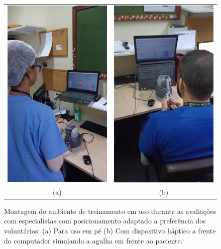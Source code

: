\begin{figure}[ht!]
    \centering
        \begin{tabular}{cc}
        \includegraphics[angle=270,width=0.4\linewidth]{capitulos/figuras/montagem-teste-especialistas-2.jpg} & 
        \includegraphics[angle=270,width=0.4\linewidth]{capitulos/figuras/montagem-teste-especialistas-3.jpg} 
        \\
        (a) & (b)
        \end{tabular}
    \caption{Montagem do ambiente de treinamento em uso durante as avaliações com especialistas com posicionamento adaptado a preferência dos voluntários: (a) Para uso em pé (b) Com dispositivo háptico a frente do computador simulando a agulha em frente ao paciente.}
    \label{fig:montagemTesteEspecialistas2e3}
\end{figure}



